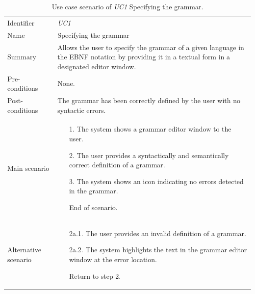 \documentclass[english,engineering]{wizthesis}
\begin{document}
\begin{xltabular}{\textwidth}{@{}L{3cm}X@{}}
  \caption{Use case scenario of \emph{UC1} Specifying the grammar.}
  \label{tab:uc1-scenario}\\
  \toprule
  \endfirsthead
  \endhead
  \endfoot
  \endlastfoot
  Identifier & \emph{UC1} \\
  \addlinespace[0.5em] Name & Specifying the grammar \\
  \addlinespace[0.5em] Summary & Allows the user to specify the grammar of a
  given language in the EBNF notation by providing it in a textual form in a
  designated editor window. \\
  \addlinespace[0.5em] Pre-conditions & None. \\
  \addlinespace[0.5em] Post-conditions & The grammar has been correctly defined
  by the user with no syntactic errors. \\
  \addlinespace[0.5em] Main scenario &
  \begin{enumerate}[noitemsep,nolistsep,labelindent=0.5cm,align=right]
    \item [1.] The system shows a grammar editor window to the user.
    \item [2.] The user provides a syntactically and semantically correct
    definition of a grammar.
    \item [3.] The system shows an icon indicating no errors detected in the
    grammar.
    \item [] End of scenario.
  \end{enumerate} \\
  \addlinespace[0.5em] Alternative scenario &
  \begin{enumerate}[noitemsep,nolistsep,labelindent=0.5cm,align=right]
    \item [2a.1.] The user provides an invalid definition of a grammar.
    \item [2a.2.] The system highlights the text in the grammar editor window at
    the error location.
    \item [] Return to step 2.
  \end{enumerate} \\* \bottomrule
\end{xltabular}
\end{document}

